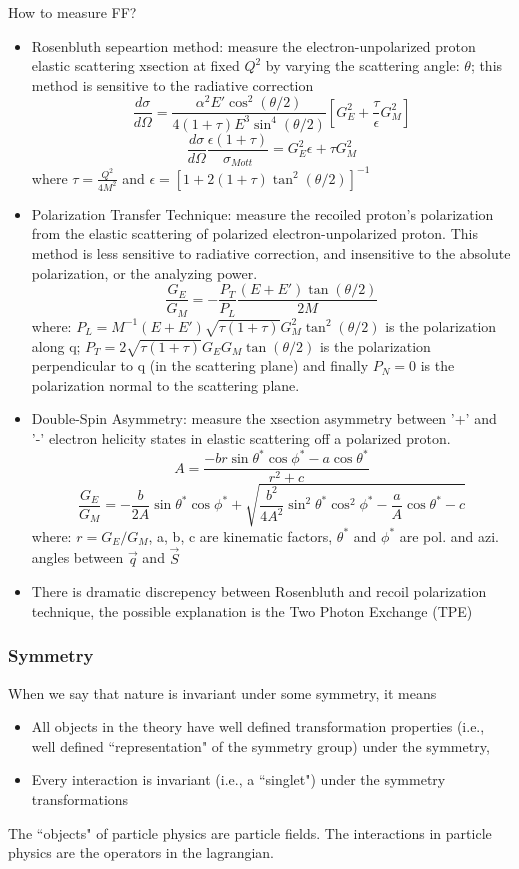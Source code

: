 How to measure FF?
\begin{itemize}
    \item Rosenbluth sepeartion method: measure the electron-unpolarized proton 
	elastic scattering xsection at fixed $Q^2$ by varying the scattering angle: $\theta$;
	this method is sensitive to the radiative correction
	$$ \frac{d\sigma}{d\Omega} = \frac{\alpha^2 E' \cos^2(\theta/2)}{4(1+\tau)E^3\sin^4(\theta/2)}
	    \left[ G_E^2 + \frac{\tau}{\epsilon}G_M^2 \right]
	$$
	$$ \frac{d\sigma}{d\Omega}\frac{\epsilon(1+\tau)}{\sigma_{Mott}} = G_E^2\epsilon + \tau G_M^2 $$
	where $\tau = \frac{Q^2}{4M^2}$ and $\epsilon = \left[ 1+2(1+\tau)\tan^2(\theta/2) \right]^{-1}$
    \item Polarization Transfer Technique: measure the recoiled proton's polarization
	from the elastic scattering of polarized electron-unpolarized proton. 
	This method is less sensitive to radiative correction, and insensitive to 
	the absolute polarization, or the analyzing power.
	$$ \frac{G_E}{G_M} = -\frac{P_T}{P_L}\frac{(E+E')\tan(\theta/2)}{2M}$$
	where: $ P_L = M^{-1}(E+E')\sqrt{\tau(1+\tau)}G_M^2\tan^2(\theta/2)$ is the
	polarization along q; $P_T = 2\sqrt{\tau(1+\tau)} G_EG_M\tan(\theta/2)$
	is the polarization perpendicular to q (in the scattering plane)
	and finally $P_N = 0$ is the polarization normal to the scattering plane.
    \item Double-Spin Asymmetry: measure the xsection asymmetry between '+' 
	and '-' electron helicity states in elastic scattering off a polarized 
	proton. 
	$$ A = \frac{-br\sin\theta^*\cos\phi^* - a\cos\theta^*}{r^2 + c}$$
	$$ \frac{G_E}{G_M} = -\frac{b}{2A}\sin\theta^*\cos\phi^* + \sqrt{\frac{b^2}{4A^2}\sin^2\theta^*\cos^2\phi^*-\frac{a}{A}\cos\theta^* - c}$$
	where: $r = G_E/G_M$, a, b, c are kinematic factors, $\theta^*$ and $\phi^*$ are pol.
	and azi. angles between $\vec{q}$ and $\vec{S}$
    \item There is dramatic discrepency between Rosenbluth and recoil polarization
	technique, the possible explanation is the Two Photon Exchange (TPE) \cite{PhysRevC.76.035205}
\end{itemize}

\subsubsection{Symmetry}
When we say that nature is invariant under some symmetry, it means
\begin{itemize}
    \item  All objects in the theory have well defined transformation properties 
	(i.e., well defined ``representation" of the symmetry group) under the symmetry,
    \item Every interaction is invariant (i.e., a ``singlet") under the symmetry transformations
\end{itemize}
The ``objects" of particle physics are particle fields.
The interactions in particle physics are the operators in the lagrangian.

